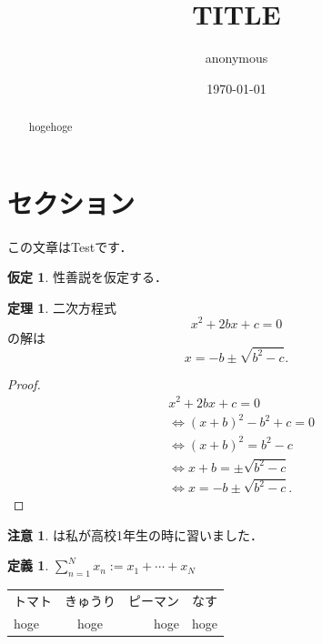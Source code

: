 \documentclass[a4paper,11pt]{jsarticle}
\theoremstyle{definition}
\newtheorem{theorem}{定理}[section]
\newtheorem{definition}[definition]{定義}
\newtheorem{remark}[remark]{注意}
\newtheorem{assumption}[assumption]{仮定}
\numberwithin{equation}{section}
\begin{document}
\title{
    TITLE
}
\author{
    anonymous 
}
\date{\today}




\maketitle

\begin{abstract}
hogehoge
\end{abstract}

\section{セクション}

この文章は\textcolor{red!80!black}{Test}です．

\begin{assumption}
    性善説を仮定する．
\end{assumption}

\begin{theorem}
    \label{theo:test}
    二次方程式
    \[
        x^2 + 2 b x +c = 0 
    \]
    の解は
    \[
        x = - b \pm \sqrt{b^2-c }
        .
    \]
\end{theorem}

\begin{proof}
    \begin{align*}
        & 
        x^2 + 2 b x +c = 0 
        \\
        & \Leftrightarrow
        (x + b)^2 -b^2 +c = 0 
        \\
        & \Leftrightarrow
        (x + b)^2 = b^2 -c
        \\
        & \Leftrightarrow
        x + b = \pm \sqrt{b^2 -c} %
        \\
        & \Leftrightarrow
        x = -b \pm \sqrt{b^2 -c}
        .  
    \end{align*}
\end{proof}

\begin{remark}
    は私が高校1年生の時に習いました．
\end{remark}

\begin{definition}
    $\sum_{n=1}^N x_n := x_1 + \cdots + x_N$
\end{definition}

\begin{table}
    \begin{tabular}{l|crp{3cm}}
        トマト & きゅうり & ピーマン & なす 
        \hline
        \\
        hoge & hoge & hoge & hoge
    \end{tabular}
\end{table}
\end{document}
